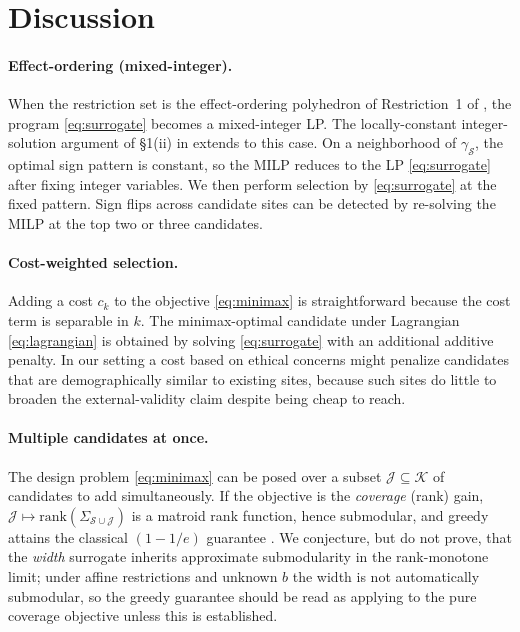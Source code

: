 \section{Discussion}
\label{sec:extensions}

\paragraph{Effect-ordering (mixed-integer).}
When the restriction set is the effect-ordering polyhedron of Restriction~1 of \citet{boyarsky2026}, the program \eqref{eq:surrogate} becomes a mixed-integer
LP. The locally-constant integer-solution argument of \S1(ii) in \citet{boyarsky2026} extends to this case. On a neighborhood of $\gamma_\mathcal{S}$, the
optimal sign pattern is constant, so the MILP reduces to the LP
\eqref{eq:surrogate} after fixing integer variables. We then perform selection
by \eqref{eq:surrogate} at the fixed pattern. Sign flips across candidate sites
can be detected by re-solving the MILP at the top two or three candidates.

\paragraph{Cost-weighted selection.}
Adding a cost $c_k$ to the objective \eqref{eq:minimax} is straightforward
because the cost term is separable in $k$. The minimax-optimal candidate under
Lagrangian \eqref{eq:lagrangian} is obtained by solving \eqref{eq:surrogate}
with an additional additive penalty. In our setting a cost based on ethical
concerns might penalize candidates that are demographically similar to existing
sites, because such sites do little to broaden the external-validity claim
despite being cheap to reach.

\paragraph{Multiple candidates at once.}
The design problem \eqref{eq:minimax} can be posed over a subset
$\mathcal{J}\subseteq\mathcal{K}$ of candidates to add simultaneously. If the
objective is the \emph{coverage} (rank) gain, $\mathcal{J}\mapsto
\mathrm{rank}(\Sigma_{\mathcal{S}\cup\mathcal{J}})$ is a matroid rank function,
hence submodular, and greedy attains the classical $(1-1/e)$ guarantee
\citep{nemhauser1978analysis}. We conjecture, but do not prove, that the
\emph{width} surrogate inherits approximate submodularity in the rank-monotone
limit; under affine restrictions and unknown $b$ the width is not automatically
submodular, so the greedy guarantee should be read as applying to the pure
coverage objective unless this is established.

